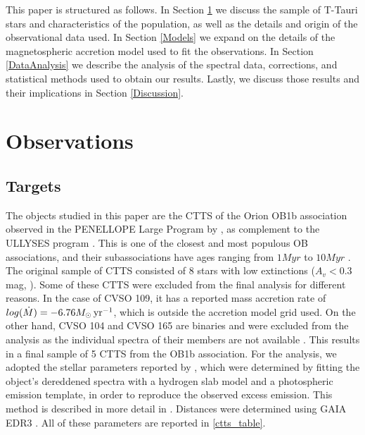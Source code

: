 \documentclass[twocolumn,linenumbers]{aastex631}
\newcommand{\msunyr}{M_{\sun} \, \rm{ yr^{-1}}}
\begin{document}
This paper is structured as follows. In Section \ref{Sample and observations} we discuss the sample of T-Tauri stars and characteristics of the population, as well as the details and origin of the observational data used. In Section \ref{Models} we expand on the details of the magnetospheric accretion model used to fit the observations. In Section \ref{DataAnalysis} we describe the analysis of the spectral data, corrections, and statistical methods used to obtain our results. Lastly, we discuss those results and their implications in Section \ref{Discussion}.



\section{Observations} \label{Sample and observations}

\subsection{Targets}
The objects studied in this paper are the CTTS of the Orion OB1b association observed in the PENELLOPE Large Program by \citep{manara2021}, as complement to the ULLYSES program \citep{roman-duval2020}. This is one of the closest and most populous OB associations, and their subassociations have ages ranging from $1Myr$ to $10Myr$ \citep{blaauw1994}. The original sample of CTTS consisted of 8 stars with low extinctions ($A_v < 0.3$mag, \citet{briceno2019}). Some of these CTTS were excluded from the final analysis for different reasons. In the case of CVSO 109, it has a reported mass accretion rate of $log(\dot{M})= -6.76\msunyr$, which is outside the accretion model grid used. On the other hand, CVSO 104 and CVSO 165 are binaries and were excluded from the analysis as the individual spectra of their members are not available \citep{manara2021a}. This results in a final sample of 5 CTTS from the OB1b association. For the analysis, we adopted the stellar parameters reported by \citet{manara2021}, which were determined by fitting the object's dereddened spectra with a hydrogen slab model and a photospheric emission template, in order to reproduce the observed excess emission. This method is described in more detail in \citep{manara2013a}. Distances were determined using GAIA EDR3 \citep{gaia2016,gaia2021}. All of these parameters are reported in \ref{ctts_table}. 
\end{document}
